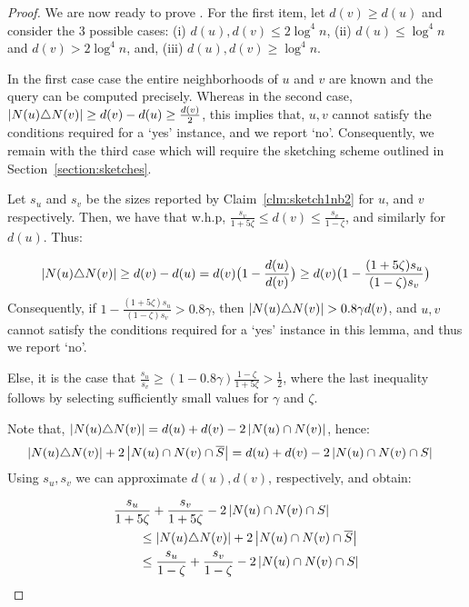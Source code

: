 \documentclass{article}
\begin{document}
\begin{proof}
We are now ready to prove . For the first item, let $d(v) \geq d(u)$ and consider the 3 possible cases: (i) $d(u),d(v) \leq 2\log^4 n$, (ii) $d(u) \leq \log^4 n$ and $d(v) > 2\log^4 n$, and, (iii) \(d(u),d(v) \geq \log^4 n\).

In the first case case the entire neighborhoods of $u$ and $v$ are known and the query can be computed precisely. Whereas in the second case, $\left|N(u) \triangle N(v)\right| \geq d(v)-d(u) \geq \frac{d(v)}{2}$, this implies that, $u,v$ cannot satisfy the conditions required for a `yes' instance, and we report `no'. Consequently, we remain with the third case which will require the sketching scheme outlined in Section~\ref{section:sketches}.

Let $s_u$ and $s_v$ be the sizes reported by Claim~\ref{clm:sketch1nb2} for $u$, and $v$ respectively. Then, we have that w.h.p, $\frac{s_v}{1+5\zeta} \leq d(v) \leq \frac{s_v}{1-\zeta}$, and similarly for $d(u)$. Thus:

\[   \left|N(u)\triangle N(v)\right| \geq d(v)-d(u) = d(v)\big(1-\frac{d(u)}{d(v)}\big) \geq d(v)\big(1-\frac{(1+5\zeta)s_u}{(1-\zeta)s_v}\big)
\]
Consequently, if $1-\frac{(1+5\zeta)s_u}{(1-\zeta)s_v} > 0.8\gamma$, then $\left|N(u) \triangle N(v)\right| > 0.8\gamma d(v)$, and $u,v$ cannot satisfy the conditions required for a `yes' instance in this lemma, and thus we report `no'.

Else, it is the case that $\frac{s_u}{s_v} \geq (1-0.8\gamma)\frac{1-\zeta}{1+5\zeta} > \frac{1}{2}$, where the last inequality follows by selecting sufficiently small values for $\gamma$ and $\zeta$.

Note that, $\left|N(u)\triangle N(v)\right| = d(u)+d(v)-2\left|N(u)\cap N(v)\right|$, hence:
\begin{equation}\label{eq:iden}
\begin{aligned}
\left|N(u)\triangle N(v)\right| + 2\left|N(u)\cap N(v)\cap \overline{S}\right| 
&= d(u)+d(v) - 2\left|N(u) \cap N(v) \cap S\right|    
\end{aligned}
\end{equation}
Using $s_u,s_v$ we can approximate $d(u),d(v)$, respectively, and obtain:

\begin{equation}\label{eq:est}
\begin{aligned}
    &\frac{s_u}{1+5\zeta} + \frac{s_v}{1+5\zeta} - 2\left|N(u) \cap N(v) \cap S\right| \\
    &\qquad\leq \left|N(u)\triangle N(v)\right| + 2\left|N(u)\cap N(v)\cap \overline{S}\right| \\
    &\qquad\leq \frac{s_u}{1-\zeta} + \frac{s_v}{1-\zeta} - 2\left|N(u) \cap N(v) \cap S\right|
\end{aligned}
\end{equation}


\end{proof}
\end{document}
